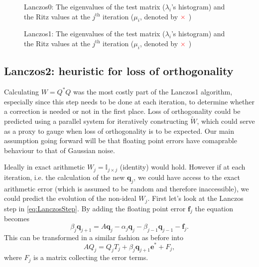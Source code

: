 \documentclass{article}
\begin{document}
	\begin{figure}
	\centering
	\caption{Lanczos0: The eigenvalues of the test matrix ($\lambda_i$'s histogram) and the Ritz values at the $j^{\mathrm{th}}$ iteration ($\mu_i$, denoted by ${\color{red} \times}$ )}\label{fig:lanczos0_W_ritz}
	\end{figure}
	
	\begin{figure}
	\centering
	\caption{Lanczos1: The eigenvalues of the test matrix ($\lambda_i$'s histogram) and the Ritz values at the $j^{\mathrm{th}}$ iteration ($\mu_i$, denoted by ${\color{red} \times}$ )}\label{fig:lanczos1_W_ritz}
	\end{figure}
	
	\FloatBarrier
	
	\subsection{Lanczos2: heuristic for loss of orthogonality}
	
	Calculating $W = Q^\ast Q$ was the most costly part of the Lanczos1 algorithm, especially since this step needs to be done at each iteration, to determine whether a correction is needed or not in the first place. Loss of orthogonality could be predicted using a parallel system for iteratively constructing $\tilde{W}$, which could serve as a proxy to gauge when loss of orthogonality is to be expected. Our main assumption going forward will be that floating point errors have comaprable behaviour to that of Gaussian noise.
	
	Ideally in exact arithmetic $W_j = \mathbb{I}_{j\times j}$ (identity) would hold. However if at each iteration, i.e. the calculation of the new $\textbf{q}_j$, we could have access to the exact arithmetic error (which is assumed to be random and therefore inaccessible), we could predict the evolution of the non-ideal $W_j$. First let's look at the Lanczos step in \autoref{eq:LanczosStep}. By adding the floating point error $\textbf{f}_j$
	the equation becomes
	\begin{equation}\label{eq:LanczosStep-f}
		\beta_j\mathbf{q}_{j+1}=A\mathbf{q}_j-\alpha_j\mathbf{q}_j-\beta_{j-1}\mathbf{q}_{j-1} - \textbf{f}_j.
	\end{equation}
	This can be transformed in a similar fashion as before into 
	\begin{equation}\label{eq:matLanczos-F}
		AQ_{j}=Q_jT_j+\beta_{j}\mathbf{q}_{j+1}\mathbf{e}^{\ast} + F_j,
	\end{equation}
	where $F_j$ is a matrix collecting the error terms.
	
\end{document}
